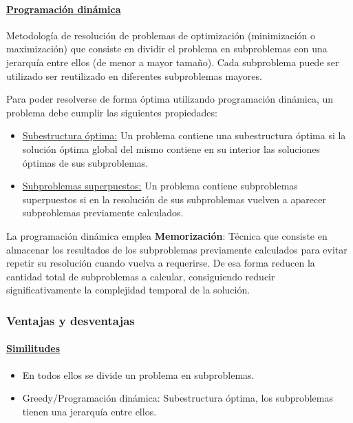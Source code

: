 \documentclass[../tp2_grupo404.tex]{subfiles}
\begin{document}
\paragraph{\underline{Programación dinámica}}
Metodología de resolución de problemas de
optimización (minimización o maximización) que consiste en dividir el
problema en subproblemas con una jerarquía entre ellos (de menor a
mayor tamaño). Cada subproblema puede ser utilizado ser reutilizado en
diferentes subproblemas mayores.
\par Para poder resolverse de forma óptima utilizando programación
dinámica, un problema debe cumplir las siguientes propiedades:
\begin{itemize}
    \item \underline{Subestructura óptima:} Un problema contiene una subestructura
    óptima si la solución óptima global del mismo contiene en su interior
    las soluciones óptimas de sus subproblemas.

    \item \underline{Subproblemas superpuestos:} Un problema contiene subproblemas
    superpuestos si en la resolución de sus subproblemas vuelven a
    aparecer subproblemas previamente calculados.
\end{itemize}
La programación dinámica emplea \textbf{Memorización}: Técnica que consiste
en almacenar los resultados de los subproblemas previamente calculados para
evitar repetir su resolución cuando vuelva a requerirse. De esa forma
reducen la cantidad total de subproblemas a calcular, consiguiendo
reducir significativamente la complejidad temporal de la solución.



\subsubsection{Ventajas y desventajas}

\paragraph{\underline{Similitudes}}
\begin{itemize}
    \item En todos ellos se divide un problema en subproblemas.
    \item Greedy/Programación dinámica: Subestructura óptima, los subproblemas
    tienen una jerarquía entre ellos.
\end{itemize}
\end{document}
